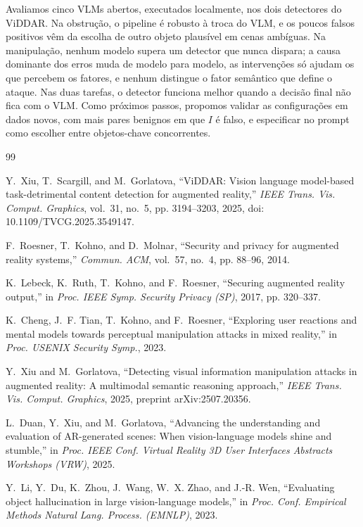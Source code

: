 \documentclass[conference]{IEEEtran}
\begin{document}
Avaliamos cinco VLMs abertos, executados localmente, nos dois detectores do ViDDAR. Na obstrução, o pipeline é robusto à troca do VLM, e os poucos falsos positivos vêm da escolha de outro
objeto plausível em cenas ambíguas. Na manipulação, nenhum modelo supera um detector que nunca dispara;
a causa dominante dos erros muda de modelo para modelo, as intervenções só ajudam os que percebem os
fatores, e nenhum distingue o fator semântico que define o ataque. Nas duas tarefas, o detector funciona melhor quando a decisão
final não fica com o VLM. Como próximos passos, propomos validar as configurações em dados novos, com
mais pares benignos em que $I$ é falso, e especificar no prompt como escolher entre objetos-chave
concorrentes.\label{fim-texto}

\begin{thebibliography}{99}

Y.~Xiu, T.~Scargill, and M.~Gorlatova, ``{ViDDAR}: Vision language model-based task-detrimental
content detection for augmented reality,'' \emph{IEEE Trans. Vis. Comput. Graphics}, vol.~31, no.~5,
pp. 3194--3203, 2025, doi: 10.1109/TVCG.2025.3549147.

F.~Roesner, T.~Kohno, and D.~Molnar, ``Security and privacy for augmented reality systems,''
\emph{Commun. ACM}, vol.~57, no.~4, pp. 88--96, 2014.

K.~Lebeck, K.~Ruth, T.~Kohno, and F.~Roesner, ``Securing augmented reality output,'' in \emph{Proc.
IEEE Symp. Security Privacy (SP)}, 2017, pp. 320--337.

K.~Cheng, J.~F. Tian, T.~Kohno, and F.~Roesner, ``Exploring user reactions and mental models towards
perceptual manipulation attacks in mixed reality,'' in \emph{Proc. USENIX Security Symp.}, 2023.

Y.~Xiu and M.~Gorlatova, ``Detecting visual information manipulation attacks in augmented reality: A
multimodal semantic reasoning approach,'' \emph{IEEE Trans. Vis. Comput. Graphics}, 2025, preprint
arXiv:2507.20356.

L.~Duan, Y.~Xiu, and M.~Gorlatova, ``Advancing the understanding and evaluation of {AR}-generated
scenes: When vision-language models shine and stumble,'' in \emph{Proc. IEEE Conf. Virtual Reality 3D
User Interfaces Abstracts Workshops (VRW)}, 2025.

Y.~Li, Y.~Du, K.~Zhou, J.~Wang, W.~X. Zhao, and J.-R. Wen, ``Evaluating object hallucination in large
vision-language models,'' in \emph{Proc. Conf. Empirical Methods Natural Lang. Process. (EMNLP)},
2023.


\end{thebibliography}
\end{document}

